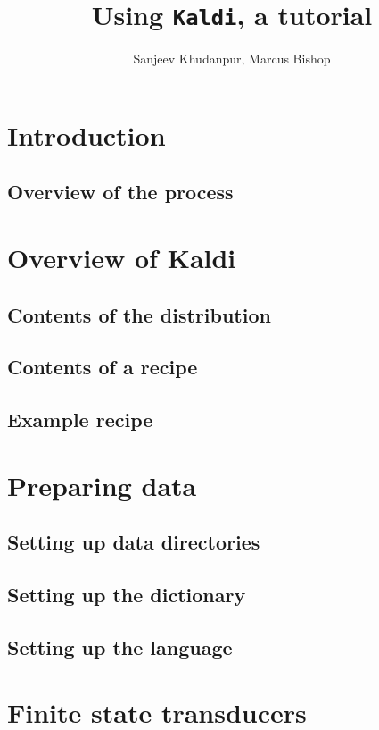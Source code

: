 \documentclass[12pt]{article}
\title{Using \texttt{Kaldi}, a tutorial}
\author{Sanjeev Khudanpur, Marcus Bishop}
\begin{document}
\maketitle

\section{Introduction}

\subsection{Overview of the process}


\section{Overview of \textsf{Kaldi}}

\subsection{Contents of the distribution}

\subsection{Contents of a recipe}

\subsection{Example recipe}


\section{Preparing data}

\subsection{Setting up data directories}

\subsection{Setting up the dictionary}\label{dict}

\subsection{Setting up the language}


\section{Finite state transducers}




\end{document}
